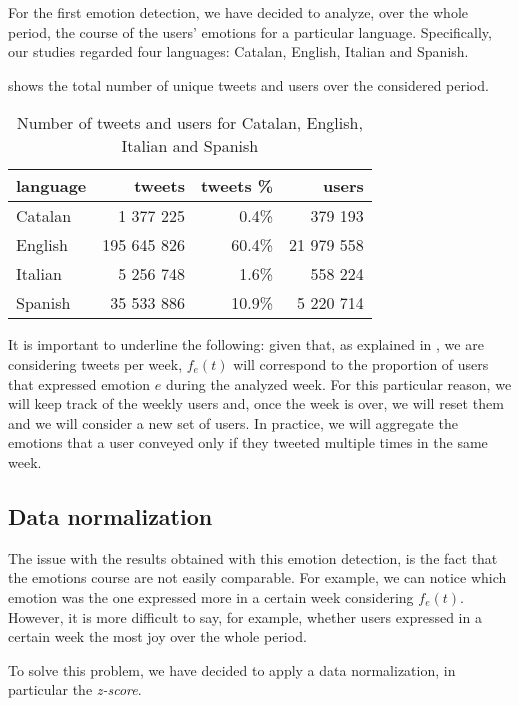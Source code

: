 For the first emotion detection, we have decided to analyze, over the whole period, the course of the users' emotions for a particular language. Specifically, our studies regarded four languages: Catalan, English, Italian and Spanish.

 shows the total number of unique tweets and users over the considered period.

\begin{table}[h]
	\centering
	\begin{tabular}{lrrr}
		\toprule
		\textbf{language} & \textbf{tweets} & \textbf{tweets \%} & \textbf{users}
		\\
		\midrule
		Catalan & 1 377 225 & 0.4\% & 379 193
		\\
		English & 195 645 826 & 60.4\% & 21 979 558 
		\\
		Italian & 5 256 748 & 1.6\% & 558 224
		\\
		Spanish & 35 533 886 & 10.9\% & 5 220 714
		\\
		\bottomrule
	\end{tabular}
	\caption{Number of tweets and users for Catalan, English, Italian and Spanish}
	\label{tab:tweet-languages}
\end{table}

It is important to underline the following: given that, as explained in , we are considering tweets per week, \(f_e(t)\) will correspond to the proportion of users that expressed emotion \(e\) during the analyzed week. For this particular reason, we will keep track of the weekly users and, once the week is over, we will reset them and we will consider a new set of users. In practice, we will aggregate the emotions that a user conveyed only if they tweeted multiple times in the same week. 

\subsection{Data normalization}
\label{subsec:normalization}

The issue with the results obtained with this emotion detection, is the fact that the emotions course are not easily comparable. For example, we can notice which emotion was the one expressed more in a certain week considering \(f_e(t)\). However, it is more difficult to say, for example, whether users expressed in a certain week the most joy over the whole period.

To solve this problem, we have decided to apply a data normalization, in particular the \textit{z-score}.

